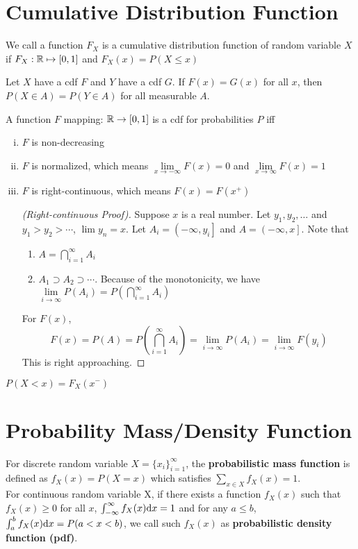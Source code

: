 \section{Cumulative Distribution Function}
\begin{definition}[C.D.F.]
	We call a function $F_X$ is a cumulative distribution function of random variable $X$ if $F_X: \mathbb{R}\mapsto \left[0,1\right]$ and $F_X(x)=P(X\leq x)$
\end{definition}

\begin{theorem}
	Let $X$ have a cdf $F$ and $Y$ have a cdf $G$. If $F(x)=G(x)$ for all $x$, then $P(X\in A)=P(Y\in A)$ for all measurable $A$.
\end{theorem}

\begin{theorem}
	A function $F$ mapping: $\mathbb{R}\to\left[0,1\right]$ is a cdf for probabilities $P$ iff
	\begin{enumerate}[(i)]
		\item $F$ is non-decreasing
		\item $F$ is normalized, which means $\lim\limits_{x\to -\infty}F(x)=0$ and $\lim\limits_{x\to \infty}F(x)=1$
		\item $F$ is right-continuous, which means $F(x) = F(x^+)$
		\begin{proof}[(Right-continuous Proof)]
			Suppose $x$ is a real number. Let $y_1,y_2,\dots$ and $y_1>y_2>\cdots$, $\lim y_n = x$. Let $A_i=\left(-\infty, y_i\right]$ and $A=\left(-\infty, x\right]$. Note that
			\begin{enumerate}[(1)]
				\item $A = \mathop{\bigcap}\limits_{i=1}^\infty A_i$
				\item $A_1\supset A_2\supset \cdots$. Because of the monotonicity, we have $\lim\limits_{i\to \infty}P(A_i)=P\left(\mathop{\bigcap}\limits_{i=1}^\infty A_i\right)$
			\end{enumerate}
			For $F(x)$,
			$$F(x)=P(A)=P\left(\mathop{\bigcap}\limits_{i=1}^\infty A_i\right)=\lim\limits_{i\to\infty}P(A_i)=\lim\limits_{i\to\infty}F(y_i)$$
			This is right approaching.
		\end{proof}
	\end{enumerate}
\end{theorem}
\begin{lemma}
	$P(X<x)=F_X(x^-)$
\end{lemma}

\section{Probability Mass/Density Function}
\begin{definition}
	For discrete random variable $X=\{x_i\}_{i=1}^{\infty}$, the \textbf{probabilistic mass function} is defined as $f_X(x)=P(X=x)$ which satisfies $\sum\limits_{x\in X}f_X(x)=1$.\\
	For continuous random variable X, if there exists a function $f_X(x)$ such that $f_X(x)\geq0$ for all $x$, $\int_{-\infty}^{\infty}f_X(x)\mathrm{d} x=1$ and for any $a\leq b$, $\int_{a}^{b}f_X(x)\mathrm{d} x=P(a<x<b)$, we call such $f_X(x)$ as \textbf{probabilistic density function (pdf)}.
\end{definition}

